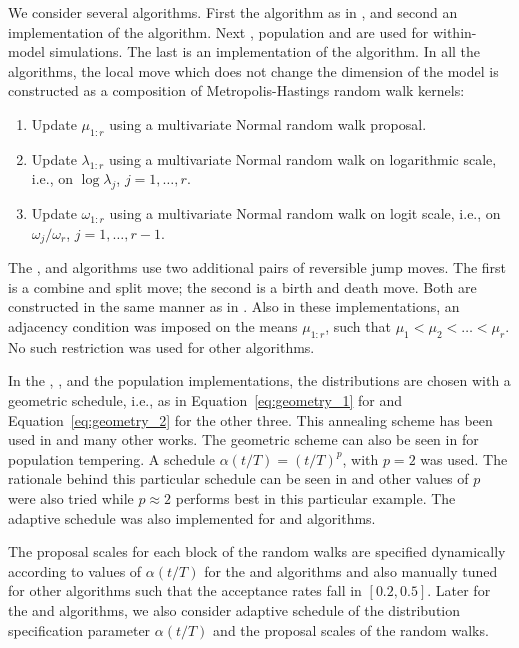 We consider several algorithms. First the \rjmcmc algorithm as in
\cite{Richardson:1997ea}, and second an implementation of the \smc[1]
algorithm. Next \ais, population \mcmc and \smc[2] are used for within-model
simulations. The last is an implementation of the \smc[3] algorithm. In all
the algorithms, the local move which does not change the dimension of the
model is constructed as a composition of Metropolis-Hastings random walk
kernels:
\begin{enumerate}
  \item Update $\mu_{1:r}$ using a multivariate Normal random walk proposal.
  \item Update $\lambda_{1:r}$ using a multivariate Normal random walk on
    logarithmic scale, i.e., on $\log\lambda_{j}$, $j = 1, \dots, r$.
  \item Update $\omega_{1:r}$ using a multivariate Normal random walk on logit
    scale, i.e., on $\omega_{j}/\omega_r$, $j = 1,\dots,r-1$.
\end{enumerate}
The \rjmcmc, \smc[1] and \smc[3] algorithms use two additional pairs of
reversible jump moves. The first is a combine and split move; the second is a
birth and death move. Both are constructed in the same manner as in
\cite{Richardson:1997ea}. Also in these implementations, an adjacency
condition was imposed on the means $\mu_{1:r}$, such that $\mu_1 < \mu_2 <
\dots < \mu_r$. No such restriction was used for other algorithms.

In the \smc[1], \smc[2], \ais and the population \mcmc implementations, the
distributions are chosen with a geometric schedule, i.e., as in
Equation~\eqref{eq:geometry_1} for \smc[1] and Equation~\eqref{eq:geometry_2}
for the other three. This annealing scheme has been used in
\cite{DelMoral:2006hc,Jasra:2007in} and many other works. The geometric scheme
can also be seen in \cite{Calderhead:2009bd} for population \mcmc tempering. A
schedule $\alpha(t/T) = (t/T)^p$, with $p = 2$ was used. The rationale behind
this particular schedule can be seen in \cite{Calderhead:2009bd} and other
values of $p$ were also tried while $p\approx2$ performs best in this
particular example. The adaptive schedule was also implemented for \smc[2] and
\ais algorithms.

The proposal scales for each block of the random walks are specified
dynamically according to values of $\alpha(t/T)$ for the \smc[2] and \ais
algorithms and also manually tuned for other algorithms such that the
acceptance rates fall in $[0.2, 0.5]$. Later for the \smc[2] and \ais
algorithms, we also consider adaptive schedule of the distribution
specification parameter $\alpha(t/T)$ and the proposal scales of the random
walks.


